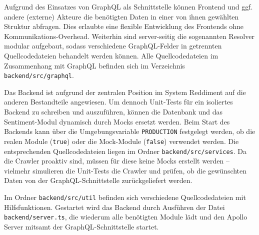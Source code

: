 \documentclass[a4paper, 10pt, conference]{IEEEtran}
\begin{document}
Aufgrund des Einsatzes von GraphQL als Schnittstelle können Frontend und ggf. andere (externe) Akteure die benötigten Daten in einer von ihnen gewählten Struktur abfragen. Dies erlaubte eine flexible Entwicklung des Frontends ohne Kommunikations-Overhead. Weiterhin sind server-seitig die sogenannten Resolver modular aufgebaut, sodass verschiedene GraphQL-Felder in getrennten Quellcodedateien behandelt werden können. Alle Quellcodedateien im Zusammenhang mit GraphQL befinden sich im Verzeichnis \texttt{backend/src/graphql}.

Das Backend ist aufgrund der zentralen Position im System Reddiment auf die anderen Bestandteile angewiesen. Um dennoch Unit-Tests für ein isoliertes Backend zu schreiben und auszuführen, können die Datenbank und das Sentiment-Modul dynamisch durch Mocks ersetzt werden. Beim Start des Backends kann über die Umgebungsvariable \texttt{PRODUCTION} festgelegt werden, ob die realen Module (\texttt{true}) oder die Mock-Module (\texttt{false}) verwendet werden. Die entsprechenden Quellcodedateien liegen im Ordner \texttt{backend/src/services}. Da die Crawler proaktiv sind, müssen für diese keine Mocks erstellt werden -- vielmehr simulieren die Unit-Tests die Crawler und prüfen, ob die gewünschten Daten von der GraphQL-Schnittstelle zurückgeliefert werden.

Im Ordner \texttt{backend/src/util} befinden sich verschiedene Quellcodedateien mit Hilfsfunktionen. Gestartet wird das Backend durch Ausführen der Datei \texttt{backend/server.ts}, die wiederum alle benötigten Module lädt und den Apollo Server mitsamt der GraphQL-Schnittstelle startet.
\end{document}
